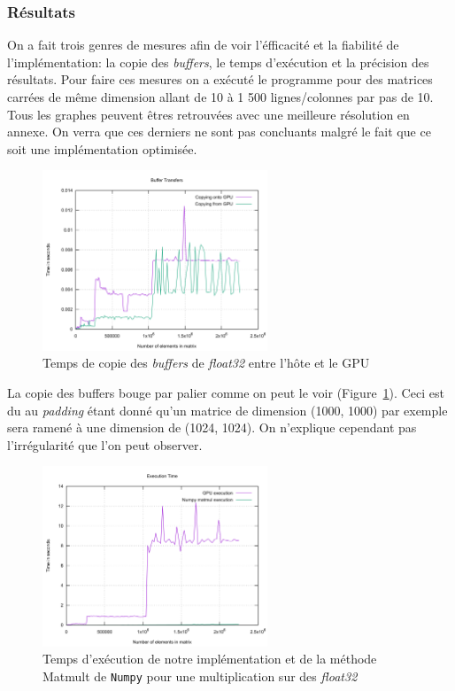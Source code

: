 \subsubsection{Résultats}

On a fait trois genres de mesures afin de voir l'éfficacité et la fiabilité 
de l'implémentation: la copie des \textit{buffers}, le temps d'exécution et 
la précision des résultats. Pour faire ces mesures on a exécuté le programme 
pour des matrices carrées de même dimension allant de 10 à 1 500 lignes/colonnes par pas de 10. 
Tous les graphes peuvent êtres retrouvées avec une meilleure résolution en annexe.
On verra que ces derniers ne sont pas concluants malgré le fait que ce soit une implémentation 
optimisée\autocite{openclguide}.


\begin{figure}[H]
\begin{center}
    \includegraphics[width=0.6\textwidth]{../../resources/buffer_transfer.png}
    \caption{Temps de copie des \textit{buffers} de \textit{float32} entre l'hôte et le GPU}
    \label{fig:buffer_transfer}
\end{center}
\end{figure}

La copie des buffers bouge par palier comme on peut le voir
(Figure~\ref{fig:buffer_transfer}). Ceci est du au \textit{padding} étant 
donné qu'un matrice de dimension (1000, 1000) par exemple sera ramené à une dimension 
de (1024, 1024). On n'explique cependant pas l'irrégularité que l'on peut observer.

\begin{figure}[H]
\begin{center}
    \includegraphics[width=0.6\textwidth]{../../resources/execution_time.png}
    \caption{Temps d'exécution de notre implémentation et de la méthode Matmult de \texttt{Numpy}
    pour une multiplication sur des \textit{float32}}
    \label{fig:execution_time}
\end{center}
\end{figure}

